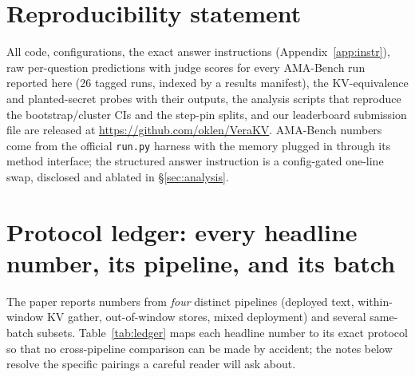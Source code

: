 \documentclass{article} %
\begin{document}
\section*{Reproducibility statement}
All code, configurations, the exact answer instructions
(Appendix~\ref{app:instr}), raw per-question predictions with judge scores for
every AMA-Bench run reported here (26 tagged runs, indexed by a results
manifest), the KV-equivalence and planted-secret probes with their outputs, the
analysis scripts that reproduce the bootstrap/cluster CIs and the step-pin
splits, and our leaderboard submission file are released at
\url{https://github.com/oklen/VeraKV}. AMA-Bench numbers come from the official
\texttt{run.py} harness with the memory plugged in through its method
interface; the structured answer instruction is a config-gated one-line swap,
disclosed and ablated in \S\ref{sec:analysis}.




\appendix
\section{Protocol ledger: every headline number, its pipeline, and its batch}
\label{app:ledger}

The paper reports numbers from \emph{four} distinct pipelines (deployed text,
within-window KV gather, out-of-window stores, mixed deployment) and several
same-batch subsets. Table~\ref{tab:ledger} maps each headline number to its exact
protocol so that no cross-pipeline comparison can be made by accident; the notes
below resolve the specific pairings a careful reader will ask about.
\end{document}
